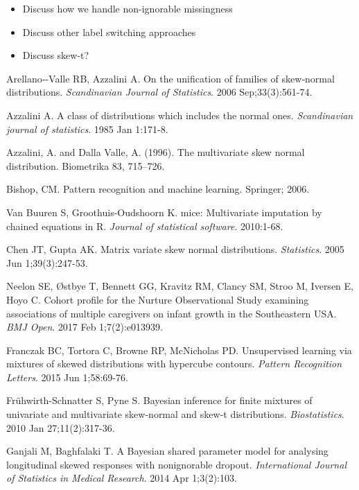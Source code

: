 \documentclass[useAMS,referee]{biom}
\begin{document}
\begin{itemize}

\item Discuss how we handle non-ignorable missingness 

\item Discuss other label switching approaches

\item Discuss skew-t?

\end{itemize}

\begin{thebibliography}{}

\bibitem{ } Arellano‐-Valle RB, Azzalini A. On the unification of families of skew‐normal distributions. \textit{Scandinavian Journal of Statistics}. 2006 Sep;33(3):561-74.

\bibitem{ } Azzalini A. A class of distributions which includes the normal ones. \textit{Scandinavian journal of statistics}. 1985 Jan 1:171-8.

\bibitem{ } Azzalini, A. and Dalla Valle, A. (1996). The multivariate skew normal distribution. Biometrika 83, 715–726.

\bibitem{ } Bishop, CM. Pattern recognition and machine learning. Springer; 2006.

\bibitem{ } Van Buuren S, Groothuis-Oudshoorn K. mice: Multivariate imputation by chained equations in R. \textit{Journal of statistical software}. 2010:1-68.

\bibitem{ } Chen JT, Gupta AK. Matrix variate skew normal distributions. \textit{Statistics}. 2005 Jun 1;39(3):247-53.

\bibitem{ } Neelon SE, \O stbye T, Bennett GG, Kravitz RM, Clancy SM, Stroo M, Iversen E, Hoyo C. Cohort profile for the Nurture Observational Study examining associations of multiple caregivers on infant growth in the Southeastern USA. \textit{BMJ Open}. 2017 Feb 1;7(2):e013939.

\bibitem{ } Franczak BC, Tortora C, Browne RP, McNicholas PD. Unsupervised learning via mixtures of skewed distributions with hypercube contours. \textit{Pattern Recognition Letters}. 2015 Jun 1;58:69-76.

\bibitem{ } Fr\"{u}hwirth-Schnatter S, Pyne S. Bayesian inference for finite mixtures of univariate and multivariate skew-normal and skew-t distributions. \textit{Biostatistics}. 2010 Jan 27;11(2):317-36.

\bibitem{ } Ganjali M, Baghfalaki T. A Bayesian shared parameter model for analysing longitudinal skewed responses with nonignorable dropout. \textit{International Journal of Statistics in Medical Research}. 2014 Apr 1;3(2):103.


\end{thebibliography}
\end{document}
